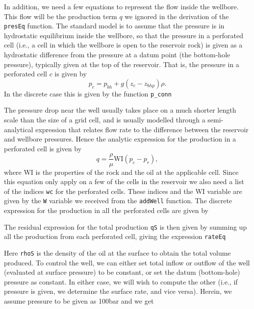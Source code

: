 In addition, we need a few equations to represent the flow inside the wellbore. This flow will be the production term $q$ we ignored in the derivation of the \texttt{presEq} function. The standard model is to assume that the pressure is in hydrostatic equilibrium inside the wellbore, so that the pressure in a perforated cell (i.e., a cell in which the wellbore is open to the reservoir rock) is given as a hydrostatic difference from the pressure at a datum point (the bottom-hole pressure), typically given at the top of the reservoir. That is, the pressure in a perforated cell $c$ is given by
\begin{equation*}
p_c = p_{bh} + g (z_c - z_{bhp})\rho.    
\end{equation*}
In the discrete case this is given by the function \texttt{p\_conn}

The pressure drop near the well usually takes place on a much shorter length scale than the size of a grid cell, and is usually modelled through a semi-analytical expression that relates flow rate to the difference between the reservoir and wellbore pressures. Hence the analytic expression for the production in a perforated cell is given by
\begin{equation*}
    q = \frac{\rho}{\mu}\mbox{WI}(p_c - p_r),
\end{equation*}
where \mbox{WI} is the properties of the rock and the oil at the applicable cell. Since this equation only apply on a few of the cells in the reservoir we also need a list of the indices \texttt{wc} for the perforated cells. These indices and the \mbox{WI} variable are given by the \texttt{W} variable we received from the \texttt{addWell} function. The discrete expression for the production in all the perforated cells are given by

The residual expression for the total production \texttt{qS} is then given by summing up all the production from each perforated cell, giving the expression \texttt{rateEq}

Here \texttt{rhoS} is the density of the oil at the surface to obtain the total volume produced. To control the well, we can either set total inflow or outflow of the well (evaluated at surface pressure) to be constant, or set the datum (bottom-hole) pressure as constant. In either case, we will wish to compute the other (i.e., if pressure is given, we determine the surface rate, and vice versa). Herein, we assume pressure to be given as 100bar and we get

